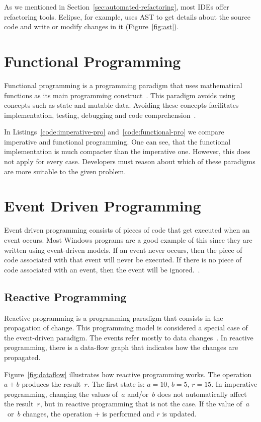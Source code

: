 \documentclass[type=bsc,accentcolor=tud9c]{tudthesis}
\begin{document}
As we mentioned in Section~\ref{sec:automated-refactoring}, most IDEs offer refactoring tools. Eclipse, for example, uses AST to get details about the source code and write or modify changes in it (Figure~\ref{fig:ast}).

\section{Functional Programming}
Functional programming is a programming paradigm that uses mathematical functions as its main programming construct~\cite{bookFunctionalProgramming}. This paradigm avoids using concepts such as state and mutable data. Avoiding these concepts facilitates implementation, testing, debugging and code comprehension~\cite{bookFunctionalProgrammingScala}.

In Listings~\ref{code:imperative-pro} and~\ref{code:functional-pro} we compare imperative and functional programming. One can see, that the functional implementation is much compacter than the imperative one. However, this does not apply for every case. Developers must reason about which of these paradigms are more suitable to the given problem.



\section{Event Driven Programming}
Event driven programming consists of pieces of code that get executed when an event occurs. Most Windows programs are a good example of this since they are written using event-driven models. If an event never occurs, then the piece of code associated with that event will never be executed. If there is no piece of code associated with an event, then the event will be ignored.~\cite{bookEventDrivenProgramming}.

\subsection{Reactive Programming}
Reactive programming is a programming paradigm that consists in the propagation of change. This programming model is considered a special case of the event-driven paradigm. The events refer mostly to data changes~\cite{bookLearningReactive}. In reactive programming, there is a data-flow graph that indicates how the changes are propagated.
 
Figure~\ref{fig:dataflow} illustrates how reactive programming works. The operation~$a + b$ produces the result~$r$. The first state is: $a=10$, $b=5$, $r=15$. In imperative programming, changing the values of~$a$ and/or~$b$ does not automatically affect the result~$r$, but in reactive programming that is not the case. If the value of~$a$~or~$b$ changes, the operation $+$ is performed and $r$ is updated. 
\end{document}

